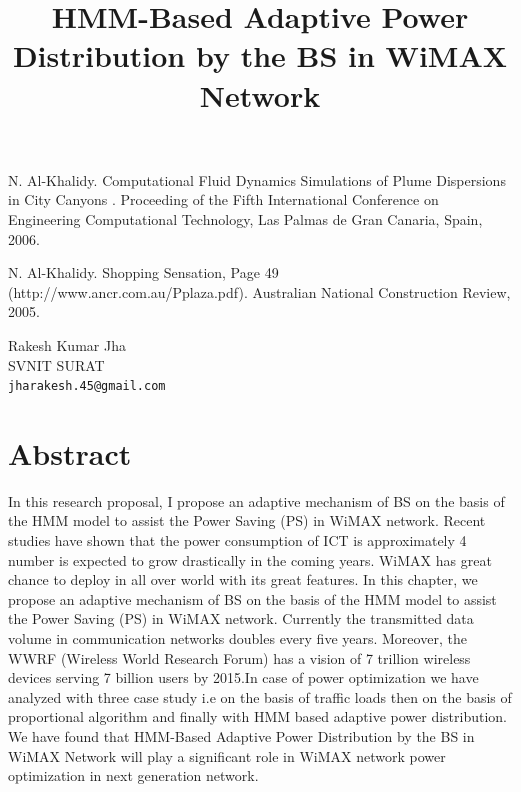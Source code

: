 \documentclass[article, A4, 11pt]{llncs}%
\begin{document}

\begin{thebibliography}{10}
{\sc N. Al-Khalidy}. {Computational Fluid Dynamics Simulations of Plume Dispersions in City Canyons }. Proceeding of the Fifth International Conference on Engineering Computational Technology, Las Palmas de Gran Canaria, Spain, 2006.

{\sc N. Al-Khalidy}. {Shopping Sensation, Page 49 (http://www.ancr.com.au/Pplaza.pdf)}. Australian National Construction Review, 2005.
\end{thebibliography} %

\title{HMM-Based Adaptive Power Distribution by the BS in WiMAX Network}
 \author{} \institute{}
\maketitle
\begin{center}
{\large Rakesh Kumar Jha}\\
SVNIT SURAT\\
{\tt jharakesh.45@gmail.com}
\end{center}

\section*{Abstract}
In this research proposal, I propose an adaptive mechanism of BS on the basis of the HMM
model to assist the Power Saving (PS) in WiMAX network. Recent studies have shown that the power
consumption of ICT is approximately 4 %
number is expected to grow drastically in the coming years. WiMAX has great chance to deploy in all
over world with its great features. In this chapter, we propose an adaptive mechanism of BS on the basis
of the HMM model to assist the Power Saving (PS) in WiMAX network. Currently the transmitted data
volume in communication networks doubles every five years. Moreover, the WWRF (Wireless World
Research Forum) has a vision of 7 trillion wireless devices serving 7 billion users by 2015.In case of
power optimization we have analyzed with three case study i.e on the basis of traffic loads then on the
basis of proportional algorithm and finally with HMM based adaptive power distribution. We have found
that HMM-Based Adaptive Power Distribution by the BS in WiMAX Network will play a significant role
in WiMAX network power optimization in next generation network.
\end{document}
